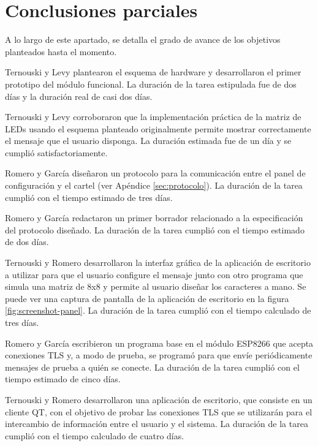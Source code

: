\section{Conclusiones parciales}
A lo largo de este apartado, se detalla el grado de avance de los objetivos planteados hasta el momento.

Ternouski y Levy plantearon el esquema de hardware y desarrollaron el primer prototipo del módulo funcional. La duración de la tarea estipulada fue de dos días y la duración real de casi dos días.

Ternouski y Levy corroboraron que la implementación práctica de la matriz de LEDs usando el esquema planteado originalmente permite mostrar correctamente el mensaje que el usuario disponga. La duración estimada fue de un día y se cumplió satisfactoriamente.

Romero y García diseñaron un protocolo para la comunicación entre el panel de configuración y el cartel (ver Apéndice \ref{sec:protocolo}). La duración de la tarea cumplió con el tiempo estimado de tres días.

Romero y García redactaron un primer borrador relacionado a la especificación del protocolo diseñado. La duración de la tarea cumplió con el tiempo estimado de dos días.

Ternouski y Romero desarrollaron la interfaz gráfica de la aplicación de escritorio a utilizar para que el usuario configure el mensaje junto con otro programa que simula una matriz de 8x8 y permite al usuario diseñar los caracteres a mano. Se puede ver una captura de pantalla de la aplicación de escritorio en la figura \ref{fig:screenshot-panel}. La duración de la tarea cumplió con el tiempo calculado de tres días.

Romero y García escribieron un programa base en el módulo ESP8266 que acepta conexiones TLS y, a modo de prueba, se programó para que envíe periódicamente mensajes de prueba a quién se conecte. La duración de la tarea cumplió con el tiempo estimado de cinco días.

Ternouski y Romero desarrollaron una aplicación de escritorio, que consiste en un cliente QT, con el objetivo de probar las conexiones TLS que se utilizarán para el intercambio de información entre el usuario y el sistema. La duración de la tarea cumplió con el tiempo calculado de cuatro días.

